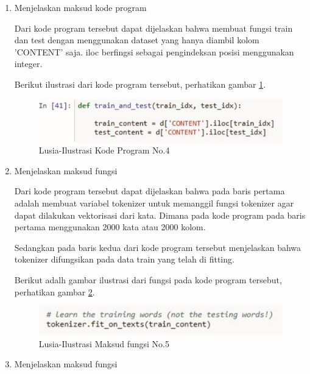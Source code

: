 \begin{enumerate}
\item Menjelaskan maksud kode program
	
	\par Dari kode program tersebut dapat dijelaskan bahwa membuat fungsi train dan test dengan menggunakan dataset yang hanya diambil kolom 'CONTENT' saja. iloc berfingsi sebagai pengindeksan posisi menggunakan integer.
	
	\par Berikut ilustrasi dari kode program tersebut, perhatikan gambar \ref{7A4}.
		\begin{figure}[!hbtp]
		\centering
		\includegraphics[scale=0.4]{figures/v4.jpg}
		\caption{Lusia-Ilustrasi Kode Program No.4}
		\label{7A4}
		\end{figure}

\item Menjelaskan maksud fungsi
	
		
	\par Dari kode program tersebut dapat dijelaskan bahwa pada baris pertama adalah membuat variabel tokenizer untuk memanggil fungsi tokenizer agar dapat dilakukan vektorisasi dari kata. Dimana pada kode program pada baris pertama menggunakan 2000 kata atau 2000 kolom.
	\par Sedangkan pada baris kedua dari kode program tersebut menjelaskan bahwa tokenizer difungsikan pada data train yang telah di fitting.
	
	\par Berikut adalh gambar ilustrasi dari fungsi pada kode program tersebut, perhatikan gambar \ref{7A5}.
	
		\begin{figure}[!hbtp]
		\centering
		\includegraphics[scale=0.4]{figures/v5.jpg}
		\caption{Lusia-Ilustrasi Maksud fungsi No.5}
		\label{7A5}
		\end{figure}

\item Menjelaskan maksud fungsi
	
		

\end{enumerate}
